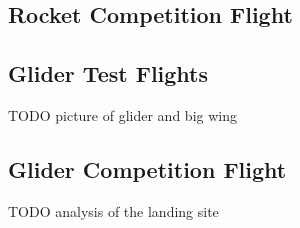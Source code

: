\subsection{Rocket Competition Flight}



\subsection{Glider Test Flights}

TODO picture of glider and big wing

\subsection{Glider Competition Flight}

TODO analysis of the landing site
